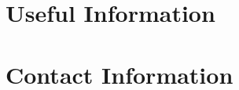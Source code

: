 \documentclass[openany, parskip=full, 12pt, a4]{scrbook}
\begin{document}


%



 
%
 
\chapter{Useful Information}



\chapter{Contact Information}



\newpage


\pagecolor{myblue}
\thispagestyle{empty}
\mbox{}
\end{document}
